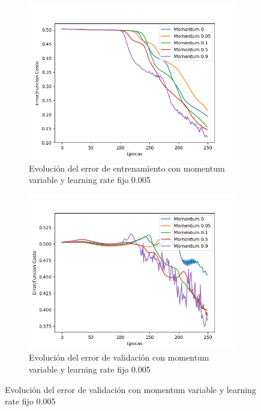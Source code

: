 \begin{figure}[!htbp]
\centering
\begin{subfigure}{.5\textwidth}
  \centering
  \includegraphics[width=1\linewidth]{graficos/eta_x_momentum_promedios_entrenamiento_3.png}
  \caption{Evolución del error de entrenamiento con momentum variable y learning rate fijo 0.005}
  \label{fig:sub1}
\end{subfigure}%
\begin{subfigure}{.5\textwidth}
  \centering
  \includegraphics[width=1\linewidth]{graficos/eta_x_momentum_promedios_validacion_3.png}
  \caption{Evolución del error de validación con momentum variable y learning rate fijo 0.005}
  \label{fig:sub2}
\end{subfigure}
\end{figure}

